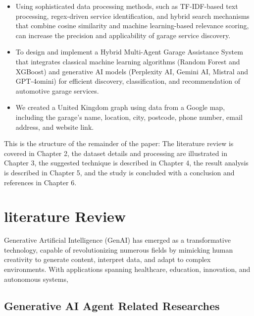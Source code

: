 \documentclass[conference]{IEEEtran}
\begin{document}
\begin{itemize}
    \item  Using sophisticated data processing methods, such as TF-IDF-based text processing, regex-driven service identification, and hybrid search mechanisms that combine cosine similarity and machine learning-based relevance scoring, can increase the precision and applicability of garage service discovery.
    \item  To design and implement a Hybrid Multi-Agent Garage Assistance System that integrates classical machine learning algorithms (Random Forest and XGBoost) and generative AI models (Perplexity AI, Gemini AI, Mistral and GPT-4omini) for efficient discovery, classification, and recommendation of automotive garage services.
    \item We created a United Kingdom graph using data from a Google map, including the garage's name, location, city, postcode, phone number, email address, and website link.
    
\end{itemize}


This is the structure of the remainder of the paper: The literature review is covered in Chapter 2, the dataset details and processing are illustrated in Chapter 3, the suggested technique is described in Chapter 4, the result analysis is described in Chapter 5, and the study is concluded with a conclusion and references in Chapter 6.



\section{literature Review}
Generative Artificial Intelligence (GenAI) has emerged as a transformative technology, capable of revolutionizing numerous fields by mimicking human creativity to generate content, interpret data, and adapt to complex environments. With applications spanning healthcare, education, innovation, and autonomous systems, 
\subsection{Generative AI Agent Related Researches}
\end{document}
